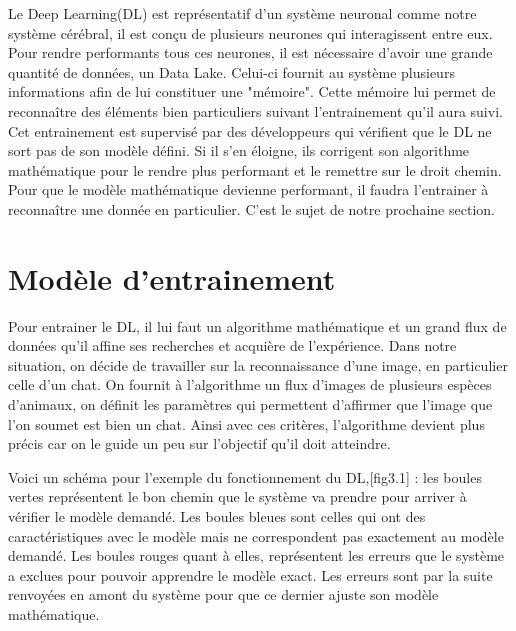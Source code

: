 \documentclass[12pt,a4paper,french]{report}
\begin{document}
Le Deep Learning(DL) est représentatif d'un système neuronal comme notre système cérébral, il est conçu de plusieurs neurones qui interagissent entre eux. Pour rendre performants tous ces neurones, il est nécessaire d'avoir une grande quantité de données, un Data Lake. Celui-ci fournit au système plusieurs informations afin de lui constituer une "mémoire". Cette mémoire lui permet de reconnaître des éléments bien particuliers suivant l'entrainement qu'il aura suivi. Cet entrainement est supervisé par des développeurs qui vérifient que le DL ne sort pas de son modèle défini.
Si il s'en éloigne, ils corrigent son algorithme mathématique pour le rendre plus performant et le remettre sur le droit chemin. Pour que le modèle mathématique devienne performant, il faudra l'entrainer à reconnaître une donnée en particulier. C'est le sujet de notre prochaine section.


\section{Modèle d'entrainement}

Pour entrainer le DL, il lui faut un algorithme mathématique et un grand flux de données qu'il affine ses recherches et acquière de l'expérience. Dans notre situation, on décide de travailler sur la reconnaissance d'une image, en particulier celle d'un chat.
On fournit à l'algorithme un flux d'images de plusieurs espèces d'animaux, on définit les paramètres qui permettent d'affirmer que l'image que l'on soumet est bien un chat. Ainsi avec ces critères, l'algorithme devient plus précis car on le guide un peu sur l'objectif qu'il doit atteindre.
 
Voici un schéma pour l'exemple du fonctionnement du DL,[fig3.1] : les boules vertes représentent le bon chemin que le système va prendre pour arriver à vérifier le modèle demandé. Les boules bleues sont celles qui ont des caractéristiques avec le modèle mais ne correspondent pas exactement au modèle demandé. Les boules rouges quant à elles, représentent les erreurs que le système a exclues pour pouvoir apprendre le modèle exact. Les erreurs sont par la suite renvoyées en amont du système pour que ce dernier ajuste son modèle mathématique.
\end{document}
